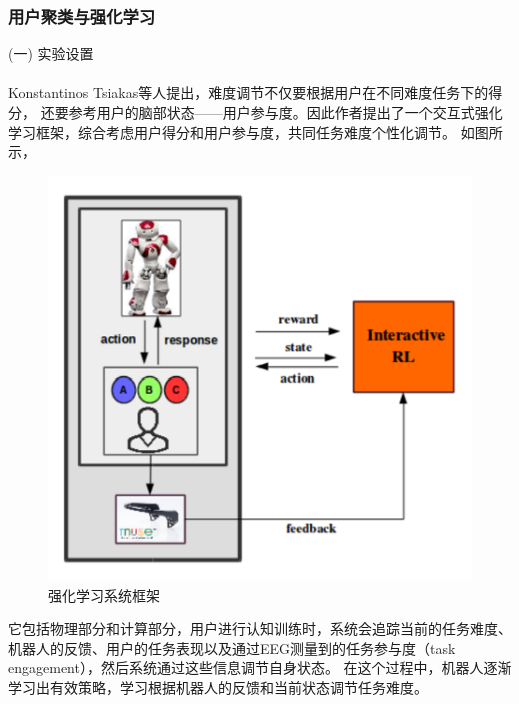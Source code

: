 \documentclass[12pt]{article}
\begin{document}
            \subsubsection{用户聚类与强化学习}
            (一) 实验设置\paragraph{}
            Konstantinos Tsiakas\cite{ref17}等人提出，难度调节不仅要根据用户在不同难度任务下的得分，
            还要参考用户的脑部状态——用户参与度。因此作者提出了一个交互式强化学习框架，综合考虑用户得分和用户参与度，共同任务难度个性化调节。
            如图所示，
            \begin{figure}[H]
            	
            	\centering
            	\includegraphics[scale=0.8]{images/RL_Frame.png}
            	\caption{强化学习系统框架\cite{ref17}}
            	\label{fig:label}
            \end{figure}
            它包括物理部分和计算部分，用户进行认知训练时，系统会追踪当前的任务难度、机器人的反馈、用户的任务表现以及通过EEG测量到的任务参与度（task engagement），然后系统通过这些信息调节自身状态。
            在这个过程中，机器人逐渐学习出有效策略，学习根据机器人的反馈和当前状态调节任务难度。
\end{document}
